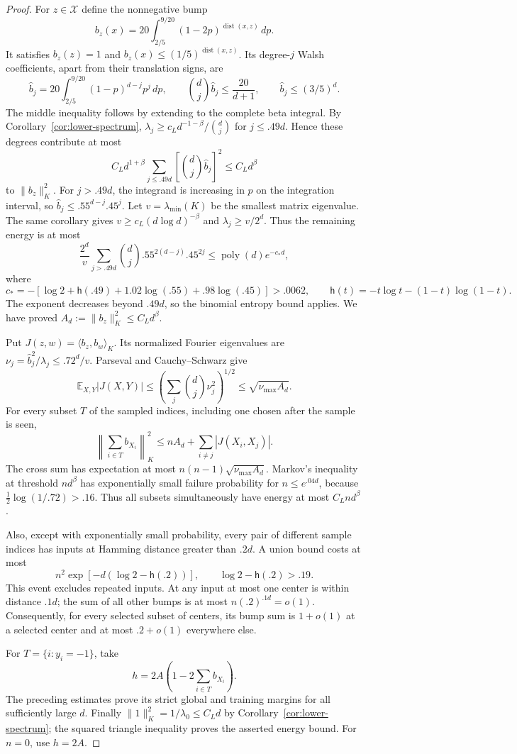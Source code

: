\begin{proof}
For $z\in\mathcal X$ define the nonnegative bump
\[
 b_z(x)=20\int_{2/5}^{9/20}(1-2p)^{\operatorname{dist}(x,z)}\,dp.
\]
It satisfies $b_z(z)=1$ and $b_z(x)\le(1/5)^{\operatorname{dist}(x,z)}$.
Its degree-$j$ Walsh coefficients, apart from their translation signs,
are
\[
 \widehat b_j=20\int_{2/5}^{9/20}(1-p)^{d-j}p^j\,dp,
 \qquad
 \binom dj\widehat b_j\le\frac{20}{d+1},\qquad
 \widehat b_j\le(3/5)^d.
\]
The middle inequality follows by extending to the complete beta integral.
By Corollary~\ref{cor:lower-spectrum},
$\lambda_j\ge c_Ld^{-1-\beta}/\binom dj$ for $j\le.49d$.
Hence these degrees contribute at most
\[
 C_Ld^{1+\beta}\sum_{j\le.49d}
       \left[\binom dj\widehat b_j\right]^2\le C_Ld^\beta
\]
to $\|b_z\|_K^2$.
For $j>.49d$, the integrand is increasing in $p$ on the integration
interval, so $\widehat b_j\le.55^{d-j}.45^j$.
Let $v=\lambda_{\min}(K)$ be the smallest matrix eigenvalue.
The same corollary gives $v\ge c_L(d\log d)^{-\beta}$ and
$\lambda_j\ge v/2^d$. Thus the remaining energy is at most
\[
 \frac{2^d}{v}\sum_{j>.49d}\binom dj .55^{2(d-j)}.45^{2j}
 \le\operatorname{poly}(d)e^{-c_*d},
\]
where
\[
 c_*=-[\log2+\mathsf h(.49)+1.02\log(.55)+.98\log(.45)]>.0062,
 \qquad \mathsf h(t)=-t\log t-(1-t)\log(1-t).
\]
The exponent decreases beyond $.49d$, so the binomial entropy bound
applies. We have proved $A_d:=\|b_z\|_K^2\le C_Ld^\beta$.

Put $J(z,w)=\langle b_z,b_w\rangle_K$.
Its normalized Fourier eigenvalues are
$\nu_j=\widehat b_j^2/\lambda_j\le .72^d/v$.
Parseval and Cauchy--Schwarz give
\[
 \mathbb E_{X,Y}|J(X,Y)|
 \le\left(\sum_j\binom dj\nu_j^2\right)^{1/2}
 \le\sqrt{\nu_{\max}A_d}.
\]
For every subset $T$ of the sampled indices, including one chosen after
the sample is seen,
\[
 \left\|\sum_{i\in T}b_{X_i}\right\|_K^2
 \le nA_d+\sum_{i\ne j}|J(X_i,X_j)|.
\]
The cross sum has expectation at most
$n(n-1)\sqrt{\nu_{\max}A_d}$.
Markov's inequality at threshold $n d^\beta$ has exponentially small
failure probability for $n\le e^{.04d}$, because
$\tfrac12\log(1/.72)>.16$.
Thus all subsets simultaneously have energy at most $C_Ln d^\beta$.

Also, except with exponentially small probability, every pair of
different sample indices has inputs at Hamming distance greater than
$.2d$. A union bound costs at most
\[
 n^2\exp[-d(\log2-\mathsf h(.2))],
 \qquad \log2-\mathsf h(.2)>.19.
\]
This event excludes repeated inputs.
At any input at most one center is within distance $.1d$; the sum of
all other bumps is at most $n(.2)^{.1d}=o(1)$.
Consequently, for every selected subset of centers, its bump sum is
$1+o(1)$ at a selected center and at most $.2+o(1)$ everywhere else.

For $T=\{i:y_i=-1\}$, take
\[
 h=2A\left(1-2\sum_{i\in T}b_{X_i}\right).
\]
The preceding estimates prove its strict global and training margins
for all sufficiently large $d$.
Finally $\|1\|_K^2=1/\lambda_0\le C_Ld$ by
Corollary~\ref{cor:lower-spectrum}; the squared triangle inequality
proves the asserted energy bound. For $n=0$, use $h=2A$.
\end{proof}

